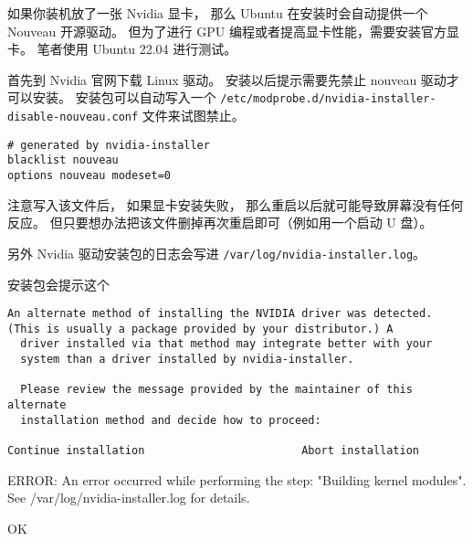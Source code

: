 
如果你装机放了一张 Nvidia 显卡， 那么 Ubuntu 在安装时会自动提供一个 Nouveau 开源驱动。 但为了进行 GPU 编程或者提高显卡性能，需要安装官方显卡。 笔者使用 Ubuntu 22.04 进行测试。

首先到 Nvidia 官网下载 Linux 驱动。 安装以后提示需要先禁止 nouveau 驱动才可以安装。 安装包可以自动写入一个 \verb`/etc/modprobe.d/nvidia-installer-disable-nouveau.conf` 文件来试图禁止。
\begin{lstlisting}[language=none,caption=nvidia-installer-disable-nouveau.conf]
# generated by nvidia-installer
blacklist nouveau
options nouveau modeset=0
\end{lstlisting}

注意写入该文件后， 如果显卡安装失败， 那么重启以后就可能导致屏幕没有任何反应。 但只要想办法把该文件删掉再次重启即可（例如用一个启动 U 盘）。

另外 Nvidia 驱动安装包的日志会写进 \verb`/var/log/nvidia-installer.log`。

安装包会提示这个
\begin{lstlisting}[language=none]
An alternate method of installing the NVIDIA driver was detected.
(This is usually a package provided by your distributor.) A      
  driver installed via that method may integrate better with your
  system than a driver installed by nvidia-installer.

  Please review the message provided by the maintainer of this alternate
  installation method and decide how to proceed:

Continue installation                        Abort installation 
\end{lstlisting}

ERROR: An error occurred while performing the step: "Building kernel modules". See /var/log/nvidia-installer.log for details.      
        
                                                                  OK 
